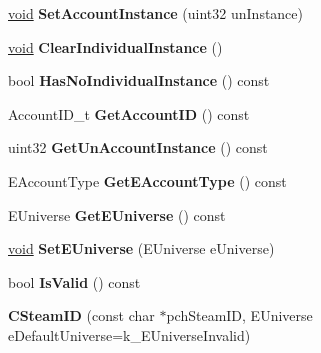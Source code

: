 \begin{DoxyCompactItemize}
\item 
\hypertarget{classCSteamID_a37af4231ff27a0d38cd40185f8e8b971}{}\hyperlink{SDL__audio_8h_a52835ae37c4bb905b903cbaf5d04b05f}{void} {\bfseries Set\+Account\+Instance} (uint32 un\+Instance)\label{classCSteamID_a37af4231ff27a0d38cd40185f8e8b971}

\item 
\hypertarget{classCSteamID_a114440392aba5cc7f62ebdc3983c54d4}{}\hyperlink{SDL__audio_8h_a52835ae37c4bb905b903cbaf5d04b05f}{void} {\bfseries Clear\+Individual\+Instance} ()\label{classCSteamID_a114440392aba5cc7f62ebdc3983c54d4}

\item 
\hypertarget{classCSteamID_a194c82148713494dec541aa3fe1d9c00}{}bool {\bfseries Has\+No\+Individual\+Instance} () const \label{classCSteamID_a194c82148713494dec541aa3fe1d9c00}

\item 
\hypertarget{classCSteamID_aeea87a472a1bc1c40516b56fe019211d}{}Account\+I\+D\+\_\+t {\bfseries Get\+Account\+I\+D} () const \label{classCSteamID_aeea87a472a1bc1c40516b56fe019211d}

\item 
\hypertarget{classCSteamID_a6d99287b8392f9967b3569c9dbb5624c}{}uint32 {\bfseries Get\+Un\+Account\+Instance} () const \label{classCSteamID_a6d99287b8392f9967b3569c9dbb5624c}

\item 
\hypertarget{classCSteamID_a3122cc8728380ffad94624b78cca269a}{}E\+Account\+Type {\bfseries Get\+E\+Account\+Type} () const \label{classCSteamID_a3122cc8728380ffad94624b78cca269a}

\item 
\hypertarget{classCSteamID_a98ee57964be6337d3e61c4bd4797ed7c}{}E\+Universe {\bfseries Get\+E\+Universe} () const \label{classCSteamID_a98ee57964be6337d3e61c4bd4797ed7c}

\item 
\hypertarget{classCSteamID_a8cde52a2039167bdf27bb250b4a6bf0b}{}\hyperlink{SDL__audio_8h_a52835ae37c4bb905b903cbaf5d04b05f}{void} {\bfseries Set\+E\+Universe} (E\+Universe e\+Universe)\label{classCSteamID_a8cde52a2039167bdf27bb250b4a6bf0b}

\item 
\hypertarget{classCSteamID_a67b02b5883a388a5558fd3a66fc8fdaa}{}bool {\bfseries Is\+Valid} () const \label{classCSteamID_a67b02b5883a388a5558fd3a66fc8fdaa}

\item 
\hypertarget{classCSteamID_a6bbdb7c51fa76f795404d7ebb33c1732}{}{\bfseries C\+Steam\+I\+D} (const char $\ast$pch\+Steam\+I\+D, E\+Universe e\+Default\+Universe=k\+\_\+\+E\+Universe\+Invalid)\label{classCSteamID_a6bbdb7c51fa76f795404d7ebb33c1732}


\end{DoxyCompactItemize}
